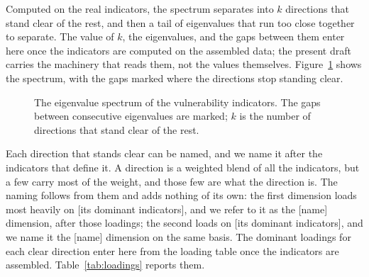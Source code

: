 Computed on the real indicators, the spectrum separates into $k$ directions that stand clear of the rest, and then a tail of eigenvalues that run too close together to separate. The value of $k$, the eigenvalues, and the gaps between them enter here once the indicators are computed on the assembled data; the present draft carries the machinery that reads them, not the values themselves. Figure~\ref{fig:spectrum} shows the spectrum, with the gaps marked where the directions stop standing clear.

\begin{figure}[ht]
\centering
\caption{The eigenvalue spectrum of the vulnerability indicators. The gaps between consecutive eigenvalues are marked; $k$ is the number of directions that stand clear of the rest.}
\label{fig:spectrum}
\end{figure}

Each direction that stands clear can be named, and we name it after the indicators that define it. A direction is a weighted blend of all the indicators, but a few carry most of the weight, and those few are what the direction is. The naming follows from them and adds nothing of its own: the first dimension loads most heavily on [its dominant indicators], and we refer to it as the [name] dimension, after those loadings; the second loads on [its dominant indicators], and we name it the [name] dimension on the same basis. The dominant loadings for each clear direction enter here from the loading table once the indicators are assembled. Table~\ref{tab:loadings} reports them.

\begin{table}[ht]
\centering
\caption{Indicator loadings on the retained directions. Each direction is named after the indicators that load most heavily on it; the tail directions carry no dominant loadings and are left unnamed.}
\label{tab:loadings}
\end{table}


